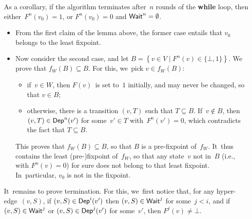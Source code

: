 As a corollary, if the algorithm terminates after~$n$ rounds of the
\textbf{while} loop, then either~$F^n(v_0)=1$, or
$F^n(v_0)=0$ and $\textsf{Wait}^n=\emptyset$.
\begin{itemize}
\item From the first claim of the lemma above, the former case entails
  that $v_0$ belongs to the least fixpoint.
\item Now consider the second case, and let $B=\left\{v\in V\mid
  F^n(v)\in \{\bot,1\}\right\}$. We prove that $f_W(B)\subseteq
  B$. For this, we~pick $v\in f_W(B)$:
  \begin{itemize}
  \item if~$v\in W$, then $F(v)$~is set to~$1$ initially, and may
    never be changed, so that $v\in B$;
  \item otherwise, there is a transition $(v,T)$ such that $T\subseteq
    B$. If~$v\notin B$, then $(v,T)\in\textsf{Dep}^n(v')$ for some~$v'\in T$
    with~$F^n(v')=0$, which contradicts the fact that $T\subseteq B$.
  \end{itemize}
  This proves that $f_W(B)\subseteq B$, so that $B$ is a pre-fixpoint
  of~$f_W$. It~thus contains the least (pre-)fixpoint of~$f_W$, so
  that any state~$v$ not in~$B$ (i.e., with $F^n(v)=0$) for sure does
  not belong to that least fixpoint. In~particular, $v_0$ is not in
  the fixpoint.
\end{itemize}



\medskip
It~remains to prove termination. For this, we~first notice that, for
any hyper-edge~$(v,S)$, if $(v,S)\in\textsf{Dep}^i(v')$ then $(v,S)\in\textsf{Wait}^j$
for some~$j<i$, and if $(v,S)\in\textsf{Wait}^j$ or $(v,S)\in\textsf{Dep}^j(v')$ for
some~$v'$, then $F^j(v)\not=\bot$.

